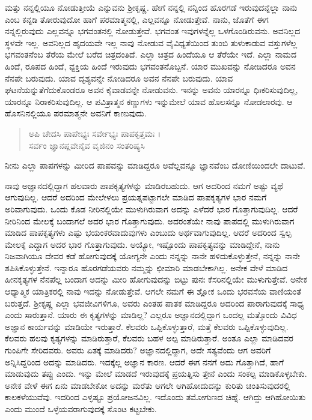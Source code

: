 ಮತ್ತು ನನ್ನಲ್ಲಿಯೂ ನೋಡುತ್ತೀಯೆ ಎನ್ನುವನು ಶ್ರೀಕೃಷ್ಣ. ಹೇಗೆ ನನ್ನಲ್ಲಿ ನನ್ನಿಂದ ಹೊರಗಡೆ ಇರುವುದನ್ನೆಲ್ಲಾ ನಾನು ಎಂಬ ಕನ್ನಡಿ ತೋರುವುದೋ ಹಾಗೆ ಪರಮಾತ್ಮನಲ್ಲಿ, ಎಲ್ಲವನ್ನೂ ನೋಡುತ್ತೇವೆ. ನಾನು, ಜೊತೆಗೆ ಈಗ ನನ್ನಲ್ಲಿರುವುದು ಎಲ್ಲವನ್ನೂ ಭಗವಂತನಲ್ಲಿ ನೋಡುತ್ತೇವೆ. ಭಗವಂತ ಇವುಗಳನ್ನೆಲ್ಲ ಒಳಗೊಂಡಿರುವನು. ಅವನಿಲ್ಲದ ಸ್ಥಳವೇ ಇಲ್ಲ. ಅವನಿಲ್ಲದ ಹೃದಯವೇ ಇಲ್ಲ ನಾವು ನೋಡುವ ವೈವಿಧ್ಯತೆಯಿಂದ ತುಂಬಿ ತುಳುಕಾಡುವ ವಸ್ತುಗಳೆಲ್ಲ ಭಗವಂತನೆಂಬ ತೆರೆಯ ಮೇಲೆ ಬರೆದ ಚಿತ್ರದಂತಿದೆ. ಎಲ್ಲಾ ಚಿತ್ರದ ಹಿಂದೆಯೂ ಆ ತೆರೆಯೇ ಇದೆ. ಎಲ್ಲಾ ನಾಮದ ಹಿಂದೆ, ರೂಪದ ಹಿಂದೆ, ವ್ಟಕ್ತಿಯ ಹಿಂದೆ ಇರುವುದು ಭಗವಂತನೊಬ್ಬನೆ. ಯಾರ ಮುಖವನ್ನು ನೋಡಿದರೂ ಅವನ ನೆನಪೇ ಬರುವುದು. ಯಾವ ದೃಶ್ಯವನ್ನೇ ನೋಡಿದರೂ ಅವನ ನೆನಪೇ ಬರುವುದು. ಯಾವ ಘಟನೆಯನ್ನುತೆಗೆದುಕೊಂಡರೂ ಅವನ ಕೈವಾಡವನ್ನೇ ನೋಡುವನು. ಇನನ್ನು ಅವನು ಯಾರನ್ನೂ ಧಿಃಕರಿಸುವುದಿಲ್ಲ, ಯಾರನ್ನೂ ನಿರಾಕರಿಸುವುದಿಲ್ಲ. ಆ ಪವಿತ್ರಾತ್ಮನ ಕಣ್ಣುಗಳು ಇನ್ನುಮೇಲೆ ಯಾವ ಹೊಲಸನ್ನೂ ನೋಡಲಾರವು. ಆ ಹೊಸನಿನಲ್ಲಿಯೂ ಪರಮಾತ್ಮನೇ ಅವನಿಗೆ ಕಾಣುವುದು.

\begin{verse}
ಅಪಿ ಚೇದಸಿ ಪಾಪೇಭ್ಯಃ ಸರ್ವೇಭ್ಯಃ ಪಾಪಕೃತ್ತಮಃ ।\\ಸರ್ವಂ ಜ್ಞಾನಪ್ಲವೇನೈವ ವೃಜಿನಂ ಸಂತರಿಷ್ಯಸಿ 
\end{verse}

{\small ನೀನು ಎಲ್ಲಾ ಪಾಪಗಳನ್ನು ಮೀರಿದ ಪಾಪವನ್ನು ಮಾಡಿದ್ದರೂ ಅವೆಲ್ಲವನ್ನೂ ಜ್ಞಾನವೆಂಬ ದೋಣಿಯಿಂದಲೇ ದಾಟುವೆ.}

ನಾವು ಅಜ್ಞಾನದಲ್ಲಿದ್ದಾಗ ಹಲವಾರು ಪಾಪಕೃತ್ಯಗಳನ್ನು ಮಾಡಿರಬಹುದು. ಆಗ ಅದರಿಂದ ನಮಗೆ ಅಷ್ಟು ವ್ಯಥೆ ಆಗುವುದಿಲ್ಲ. ಆದರೆ ಅದರಿಂದ ಮೇಲೇಳಲು ಪ್ರಯತ್ನಪಟ್ಟಾಗಲೇ ಮಾಡಿದ ಪಾಪಕೃತ್ಯಗಳ ಭಾರ ನಮಗೆ ಅರಿವಾಗುವುದು. ಒಂದು ಕೊಡ ನೀರಿನಲ್ಲಿಯೇ ಮುಳುಗಿರುವಾಗ ಅದನ್ನು ಎಳೆದರೆ ಭಾರ ಗೊತ್ತಾಗುವುದಿಲ್ಲ. ಆದರೆ ನೀರಿನಿಂದ ಮೇಲಕ್ಕೆ ಬಂದಾಗಲೆ ಅದರ ಭಾರ ಗೊತ್ತಾಗುವುದು. ಅದರಂತೆಯೇ ನಾವು ಪಾಪದಲ್ಲಿ ಮುಳುಗಿರುವಾಗ ಮಾಡಿದ ಪಾಪಕೃತ್ಯಗಳು ಎಷ್ಟು ಭಯಂಕರವಾದುವುಗಳು ಎಂಬುದು ಅರ್ಥವಾಗುವುದಿಲ್ಲ. ಆದರೆ ಅದರಿಂದ ಸ್ವಲ್ಪ ಮೇಲಕ್ಕೆ ಎದ್ದಾಗ ಅದರ ಭಾರ ಗೊತ್ತಾಗುವುದು. ಅಯ್ಯೋ, ಇಷ್ಟೊಂದು ಪಾಪಕೃತ್ಯವನ್ನು ಮಾಡಿದ್ದೇನೆ, ನಾನು ನಿಜವಾಗಿಯೂ ದೇವರ ಕಡೆ ಹೋಗುವುದಕ್ಕೆ ಯೋಗ್ಯನೇ ಎಂದು ನನ್ನನ್ನು ನಾನೇ ಹಳಿದುಕೊಳ್ಳುತ್ತೇನೆ, ನನ್ನನ್ನು ನಾನೇ ಶಪಿಸಿಕೊಳ್ಳುತ್ತೇನೆ. ಇನ್ನಾರೂ ಹೊರಗಡೆಯವರು ನಮ್ಮನ್ನು ಛೀಮಾರಿ ಮಾಡಬೇಕಾಗಿಲ್ಲ. ಅನೇಕ ವೇಳೆ ಮಾಡಿದ ಹೀನಕೃತ್ಯಗಳ ನೆನಪೆಲ್ಲ ಬಂದಾಗ ಅದನ್ನು ಮೀರಿ ಹೋಗುವುದನ್ನು ಬಿಟ್ಟು ಪುನಃ ಕೆಸರಿನಲ್ಲಿಯೇ ಮುಳುಗುತ್ತೇವೆ. ಅನೇಕ ಆಧ್ಯಾತ್ಮಿಕ ಯಾತ್ರಿಕರಲ್ಲಿ ನಾವು ಇದನ್ನು ನೋಡುತ್ತೇವೆ. ಆಗಲೇ ನಮಗೆ ಈ ಶ್ಲೋಕ ಒಂದು ಭರವಸೆಯ ವಾಣಿಯಂತೆ ಬರುತ್ತದೆ. ಶ್ರೀಕೃಷ್ಣ ಎಲ್ಲಾ ಭವಜೀವಿಗಳಿಗೂ, ಅವರು ಎಂತಹ ಪಾತಕ ಮಾಡಿದ್ದರೂ ಅದರಿಂದ ಪಾರಾಗುವುದಕ್ಕೆ ಸಾಧ್ಯ ಎಂದು ಸಾರುತ್ತಾನೆ. ಯಾರು ಈ ಕೃತ್ಯಗಳನ್ನು ಮಾಡಿಲ್ಲ? ಎಲ್ಲರೂ ಅಜ್ಞಾನದಲ್ಲಿದ್ದಾಗ ಒಂದಲ್ಲ ಮತ್ತೊಂದು ವಿವಿಧ ಅಜ್ಞಾನ ಕಾರ್ಯವನ್ನು ಮಾಡಿಯೇ ಇರುತ್ತಾರೆ. ಕೆಲವರು ಒಪ್ಪಿಕೊಳ್ಳುತ್ತಾರೆ, ಮತ್ತೆ ಕೆಲವರು ಒಪ್ಪಿಕೊಳ್ಳುವುದಿಲ್ಲ. ಕೆಲವರು ಹಲವು ಕೃತ್ಯಗಳನ್ನು ಮಾಡಿರುತ್ತಾರೆ, ಕೆಲವರು ಬಹಳ ಅಲ್ಪ ಮಾಡಿರುತ್ತಾರೆ. ಅಂತೂ ಎಲ್ಲಾ ಮಾಡಿದವರ ಗುಂಪಿಗೇ ಸೇರಿದವರು. ಅವರು ಏತಕ್ಕೆ ಮಾಡಿದರು? ಅಜ್ಞಾನದಲ್ಲಿದ್ದಾಗ, ಅದೇ ಸತ್ಯವೆಂದು ಆಗ ಅವರಿಗೆ ಅನ್ನಿಸಿದ್ದರಿಂದ ಅದನ್ನು ಮಾಡಿದರು. ಇದಕ್ಕೆಲ್ಲ ಅಜ್ಞಾನ ಕಾರಣ. ಆದರೆ ಈಗ ನನಗೆ ಅದು ಗೊತ್ತಾಗಿದೆ, ಹಾಗೆ ಮಾಡುವುದು ತಪ್ಪು ಎಂದು. ಇನ್ನು ಮೇಲೆ ಮಾಡದೆ ಇರುವುದಕ್ಕೆ ಪ್ರಯತ್ನಿಸು ತ್ತೇನೆ ಎಂದು ಸಂಕಲ್ಪ ಮಾಡಿಕೊಳ್ಳಬೇಕು. ಅನೇಕ ವೇಳೆ ಈಗ ಏನು ಮಾಡಬೇಕೋ ಅದನ್ನು ಮರೆತು ಆಗಲೇ ಆಗಿಹೋದುದನ್ನು ಕುರಿತು ಚಿಂತಿಸುವುದರಲ್ಲಿ ಕಾಲಕಳೆಯುವೆವು. ಇದರಿಂದ ಎಳ್ಳಷ್ಟೂ ಪ್ರಯೋಜನವಿಲ್ಲ. ಇದೊಂದು ತಮೋಗುಣದ ಚಿಹ್ನೆ. ಆಗಿದ್ದು ಆಗಿಹೋಯಿತು ಎಂದು ಮುಂದೆ ಒಳ್ಳೆಯವರಾಗುವುದಕ್ಕೆ ಸೊಂಟ ಕಟ್ಟಬೇಕು.

